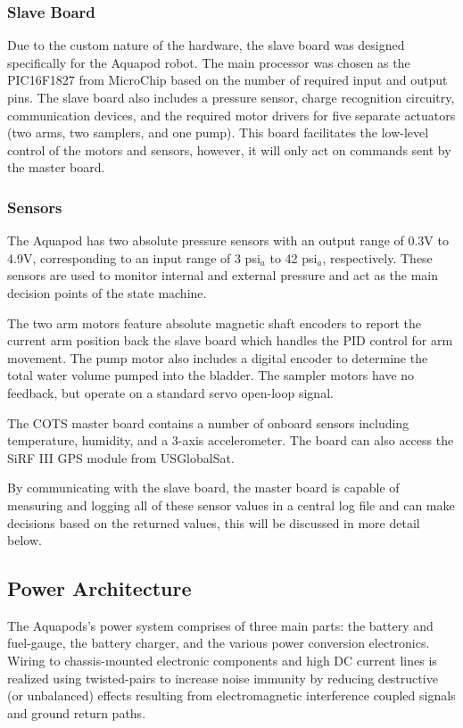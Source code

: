\subsubsection*{Slave Board}
Due to the custom nature of the hardware, the slave board was designed specifically for the Aquapod robot. The main processor was chosen as the PIC16F1827 from MicroChip based on the number of required input and output pins. The slave board also includes a pressure sensor, charge recognition circuitry, communication devices, and the required motor drivers for five separate actuators (two arms, two samplers, and one pump). This board facilitates the low-level control of the motors and sensors, however, it will only act on commands sent by the master board.

\subsubsection*{Sensors}
The Aquapod has two absolute pressure sensors with an output range of 0.3V to 4.9V, corresponding to an input range of 3 psi\(_a\) to 42 psi\(_a\), respectively. These sensors are used to monitor internal and external pressure and act as the main decision points of the state machine.

The two arm motors feature absolute magnetic shaft encoders to report the current arm position back the slave board which handles the PID control for arm movement. The pump motor also includes a digital encoder to determine the total water volume pumped into the bladder. The sampler motors have no feedback, but operate on a standard servo open-loop signal.

The COTS master board contains a number of onboard sensors including temperature, humidity, and a 3-axis accelerometer. The board can also access the SiRF III GPS module from USGlobalSat.

By communicating with the slave board, the master board is capable of measuring and logging all of these sensor values in a central log file and can make decisions based on the returned values, this will be discussed in more detail below.
\subsection*{Power Architecture}
The Aquapods's power system comprises of three main parts: the battery and fuel-gauge, the battery charger, and the various power conversion electronics.  Wiring to chassis-mounted electronic components and high DC current lines is realized using twisted-pairs to increase noise immunity by reducing destructive (or unbalanced) effects resulting from electromagnetic interference coupled signals and ground return paths.

